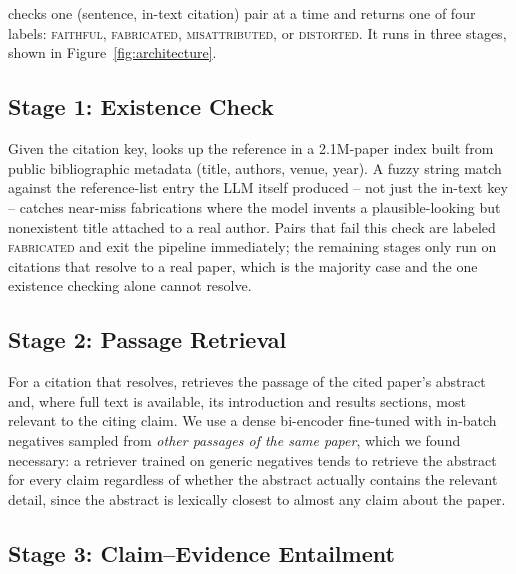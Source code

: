 \section{}
\label{sec:method}

 checks one (sentence, in-text citation) pair at a time and
returns one of four labels: \textsc{faithful}, \textsc{fabricated},
\textsc{misattributed}, or \textsc{distorted}. It runs in three stages,
shown in Figure~\ref{fig:architecture}.

\subsection{Stage 1: Existence Check}

Given the citation key,  looks up the reference in a
2.1M-paper index built from public bibliographic metadata (title, authors,
venue, year). A fuzzy string match against the reference-list entry the LLM
itself produced -- not just the in-text key -- catches near-miss
fabrications where the model invents a plausible-looking but nonexistent
title attached to a real author. Pairs that fail this check are labeled
\textsc{fabricated} and exit the pipeline immediately; the remaining stages
only run on citations that resolve to a real paper, which is the majority
case and the one existence checking alone cannot resolve.

\subsection{Stage 2: Passage Retrieval}
\label{sec:retrieval}

For a citation that resolves,  retrieves the passage of
the cited paper's abstract and, where full text is available, its
introduction and results sections, most relevant to the citing claim. We
use a dense bi-encoder fine-tuned with in-batch negatives sampled from
\emph{other passages of the same paper}, which we found necessary: a
retriever trained on generic negatives tends to retrieve the abstract for
every claim regardless of whether the abstract actually contains the
relevant detail, since the abstract is lexically closest to almost any
claim about the paper.

\subsection{Stage 3: Claim--Evidence Entailment}

